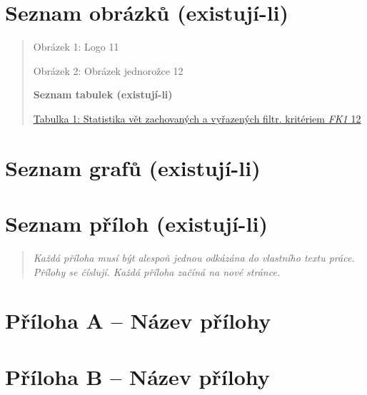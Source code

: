 \documentclass[
]{article}
\begin{document}
\newpage
\hypertarget{seznam-obruxe1zkux16f-existujuxed-li}{%
\section{Seznam obrázků
(existují-li)}\label{seznam-obruxe1zkux16f-existujuxed-li}}

\begin{quote}
Obrázek 1: Logo 11

Obrázek 2: Obrázek jednorožce 12

\newpage
\textbf{Seznam tabulek (existují-li)}

\protect\hyperlink{_bookmark9}{Tabulka 1: Statistika vět zachovaných a
vyřazených filtr. kritériem \emph{FK1} 12}
\end{quote}

\newpage
\hypertarget{seznam-grafux16f-existujuxed-li}{%
\section{Seznam grafů
(existují-li)}\label{seznam-grafux16f-existujuxed-li}}

\newpage
\hypertarget{seznam-pux159uxedloh-existujuxed-li}{%
\section{Seznam příloh
(existují-li)}\label{seznam-pux159uxedloh-existujuxed-li}}

\begin{quote}
\emph{Každá příloha musí být alespoň jednou odkázána do vlastního textu
práce. Přílohy se číslují. Každá příloha začíná na nové stránce.}
\end{quote}

\newpage
\hypertarget{pux159uxedloha-a-nuxe1zev-pux159uxedlohy}{%
\section{Příloha A -- Název
přílohy}\label{pux159uxedloha-a-nuxe1zev-pux159uxedlohy}}

\newpage
\hypertarget{pux159uxedloha-b-nuxe1zev-pux159uxedlohy}{%
\section{Příloha B -- Název
přílohy}\label{pux159uxedloha-b-nuxe1zev-pux159uxedlohy}}
\end{document}
